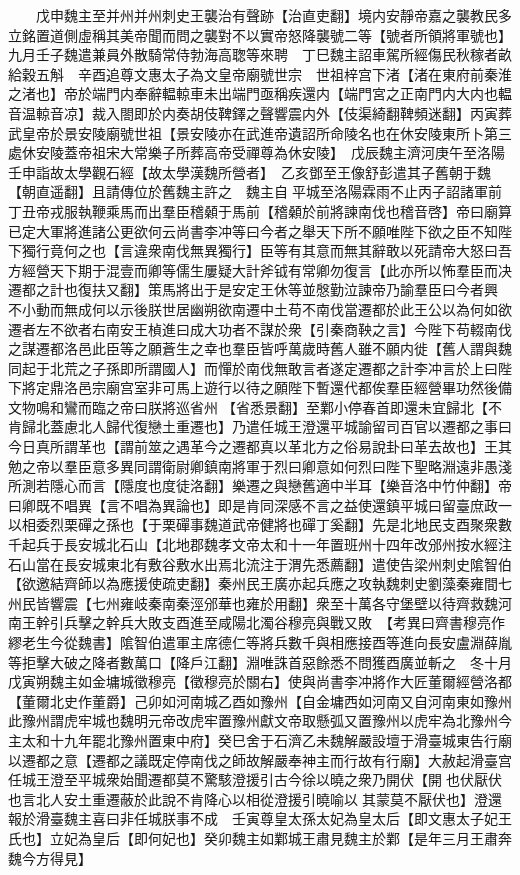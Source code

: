 　　戊申魏主至并州并州刺史王襲治有聲跡【治直吏翻】境内安靜帝嘉之襲教民多立銘置道側虛稱其美帝聞而問之襲對不以實帝怒降襲號二等【號者所領將軍號也】　九月壬子魏遣兼員外散騎常侍勃海高聦等來聘　丁巳魏主詔車駕所經傷民秋稼者畝給穀五斛　辛酉追尊文惠太子為文皇帝廟號世宗　世祖梓宫下渚【渚在東府前秦淮之渚也】帝於端門内奉辭輼輬車未出端門亟稱疾還内【端門宮之正南門内大内也輼音温輬音凉】裁入閤即於内奏胡伎鞞鐸之聲響震内外【伎渠綺翻鞞頻迷翻】丙寅葬武皇帝於景安陵廟號世祖【景安陵亦在武進帝遺詔所命陵名也在休安陵東所卜第三處休安陵蓋帝祖宋大常樂子所葬高帝受禪尊為休安陵】　戊辰魏主濟河庚午至洛陽壬申詣故太學觀石經【故太學漢魏所營者】　乙亥鄧至王像舒彭遣其子舊朝于魏【朝直遥翻】且請傳位於舊魏主許之　魏主自平城至洛陽霖雨不止丙子詔諸軍前丁丑帝戎服執鞭乘馬而出羣臣稽顙于馬前【稽顙於前將諫南伐也稽音啓】帝曰廟算已定大軍將進諸公更欲何云尚書李冲等曰今者之舉天下所不願唯陛下欲之臣不知陛下獨行竟何之也【言違衆南伐無異獨行】臣等有其意而無其辭敢以死請帝大怒曰吾方經營天下期于混壹而卿等儒生屢疑大計斧钺有常卿勿復言【此亦所以怖羣臣而决遷都之計也復扶又翻】策馬將出于是安定王休等並慇勤泣諫帝乃諭羣臣曰今者興不小動而無成何以示後朕世居幽朔欲南遷中土苟不南伐當遷都於此王公以為何如欲遷者左不欲者右南安王楨進曰成大功者不謀於衆【引秦商鞅之言】今陛下苟輟南伐之謀遷都洛邑此臣等之願蒼生之幸也羣臣皆呼萬歲時舊人雖不願内徙【舊人謂與魏同起于北荒之子孫即所謂國人】而憚於南伐無敢言者遂定遷都之計李冲言於上曰陛下將定鼎洛邑宗廟宫室非可馬上遊行以待之願陛下暫還代都俟羣臣經營畢功然後備文物鳴和鸞而臨之帝曰朕將巡省州【省悉景翻】至鄴小停春首即還未宜歸北【不肯歸北蓋慮北人歸代復戀土重遷也】乃遣任城王澄還平城諭留司百官以遷都之事曰今日真所謂革也【謂前筮之遇革今之遷都真以革北方之俗易說卦曰革去故也】王其勉之帝以羣臣意多異同謂衛尉卿鎮南將軍于烈曰卿意如何烈曰陛下聖略淵遠非愚淺所測若隱心而言【隱度也度徒洛翻】樂遷之與戀舊適中半耳【樂音洛中竹仲翻】帝曰卿既不唱異【言不唱為異論也】即是肯同深感不言之益使還鎮平城曰留臺庶政一以相委烈栗磾之孫也【于栗磾事魏道武帝健將也磾丁奚翻】先是北地民支酉聚衆數千起兵于長安城北石山【北地郡魏孝文帝太和十一年置班州十四年改邠州按水經注石山當在長安城東北有敷谷敷水出焉北流注于渭先悉薦翻】遣使告梁州刺史隂智伯【欲邀結齊師以為應援使疏吏翻】秦州民王廣亦起兵應之攻執魏刺史劉藻秦雍間七州民皆響震【七州雍岐秦南秦涇邠華也雍於用翻】衆至十萬各守堡壁以待齊救魏河南王幹引兵擊之幹兵大敗支酉進至咸陽北濁谷穆亮與戰又敗　【考異曰齊書穆亮作繆老生今從魏書】隂智伯遣軍主席德仁等將兵數千與相應接酉等進向長安盧淵薛胤等拒擊大破之降者數萬口【降戶江翻】淵唯誅首惡餘悉不問獲酉廣並斬之　冬十月戊寅朔魏主如金墉城徵穆亮【徵穆亮於關右】使與尚書李冲將作大匠董爾經營洛都【董爾北史作董爵】己卯如河南城乙酉如豫州【自金墉西如河南又自河南東如豫州此豫州謂虎牢城也魏明元帝改虎牢置豫州獻文帝取懸弧又置豫州以虎牢為北豫州今主太和十九年罷北豫州置東中府】癸巳舍于石濟乙未魏解嚴設壇于滑臺城東告行廟以遷都之意【遷都之議既定停南伐之師故解嚴奉神主而行故有行廟】大赦起滑臺宫任城王澄至平城衆始聞遷都莫不驚駭澄援引古今徐以曉之衆乃開伏【開也伏厭伏也言北人安土重遷蔽於此說不肯降心以相從澄援引曉喻以其蒙莫不厭伏也】澄還報於滑臺魏主喜曰非任城朕事不成　壬寅尊皇太孫太妃為皇太后【即文惠太子妃王氏也】立妃為皇后【即何妃也】癸卯魏主如鄴城王肅見魏主於鄴【是年三月王肅奔魏今方得見】

